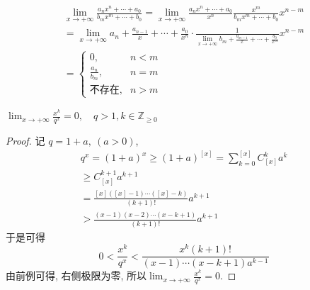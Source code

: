\begin{example}
    \begin{gather}
      \lim_{x \to +\infty} \frac{a_n x^{n} + \cdots +a_0}{b_m x^{m} + \cdots +b_0}
      = \lim_{x \to +\infty} \frac{a_n x^{n}+ \cdots + a_0}{x^{n}} \frac{x^{m}}{b_m x^{m}+ \cdots +b_0} x^{n-m}
      \\
      = \lim_{x \to +\infty} a_n + \frac{a_{n-1}}{x} + \cdots + \frac{a_0}{x^{n}} \cdot \frac{1}{ \displaystyle \lim_{x \to +\infty} b_m + \frac{b_{m-1}}{x} + \cdots + \frac{b_0}{x^{m}}} x^{n-m}
      \\
      = \begin{cases} 
        0, & n < m 
        \\ 
        \frac{a_n}{b_m}, & n = m
        \\
        \text{不存在}, & n > m
      \end{cases}
    \end{gather}
\end{example}

\begin{proposition}[多项式增长远小于指数增长]
    $\displaystyle 
    \lim_{x \to +\infty} \frac{x^{k}}{q^{x}} = 0, \quad q > 1, k \in \mathbb{Z}_{\ge 0}
    $
\end{proposition}

\begin{proof}
    记 $q = 1 + a, \ (a > 0)$,
    \begin{equation}
        \begin{gathered}
            q^{x} = \left( 1 + a \right)^{x} \ge \left( 1 + a \right) ^{[x]} = \sum_{k=0}^{[x]} C_{[x]}^{k} a^{k}
            \\
            \ge  C_{[x]} ^{k +1} a^{ k+1}
            \\
            = \frac{[x] \left( [x] - 1 \right) \cdots \left( [x] - k \right) }{(k+1)!} a^{k+1}
            \\
            > \frac{\left( x-1 \right) \left( x-2 \right) \cdots \left( x- k + 1 \right) }{\left( k+1 \right) !} a^{k +1}
        \end{gathered}
    \end{equation}
    于是可得
    \begin{equation}
        0 < \frac{x^{k}}{q^{x}} < \frac{x^{k} \left( k +1 \right) !}{\left( x-1 \right) \cdots \left( x -k + 1 \right) a^{k-1}}
    \end{equation}
    由前例可得, 右侧极限为零, 所以$\displaystyle \lim_{x \to +\infty} \frac{x^{k}}{q^{x}} = 0$.
\end{proof}

